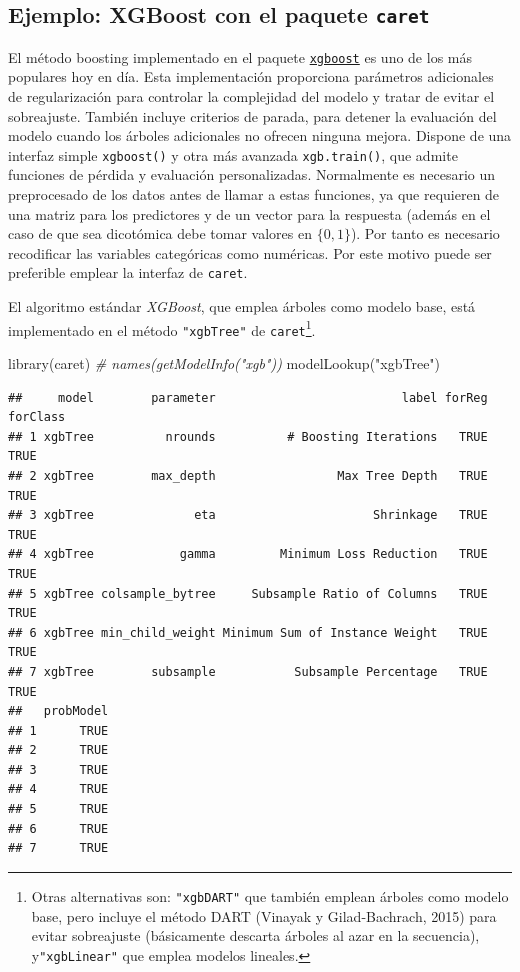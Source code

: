 \documentclass[
]{book}
\newenvironment{Shaded}{\begin{snugshade}}{\end{snugshade}}
\newcommand{\CommentTok}[1]{\textcolor[rgb]{0.56,0.35,0.01}{\textit{#1}}}
\newcommand{\FunctionTok}[1]{\textcolor[rgb]{0.00,0.00,0.00}{#1}}
\newcommand{\NormalTok}[1]{#1}
\newcommand{\StringTok}[1]{\textcolor[rgb]{0.31,0.60,0.02}{#1}}
\theoremstyle{break}
\theoremstyle{definition}
\theoremstyle{definition}
\theoremstyle{definition}
\theoremstyle{definition}
\theoremstyle{remark}
\begin{document}
\hypertarget{ejemplo-xgboost-con-el-paquete-caret}{%
\subsection{\texorpdfstring{Ejemplo: XGBoost con el paquete \texttt{caret}}{Ejemplo: XGBoost con el paquete caret}}\label{ejemplo-xgboost-con-el-paquete-caret}}

El método boosting implementado en el paquete \href{https://github.com/dmlc/xgboost/tree/master/R-package}{\texttt{xgboost}} es uno de los más populares hoy en día.
Esta implementación proporciona parámetros adicionales de regularización para controlar la complejidad del modelo y tratar de evitar el sobreajuste.
También incluye criterios de parada, para detener la evaluación del modelo cuando los árboles adicionales no ofrecen ninguna mejora.
Dispone de una interfaz simple \texttt{xgboost()} y otra más avanzada \texttt{xgb.train()}, que admite funciones de pérdida y evaluación personalizadas.
Normalmente es necesario un preprocesado de los datos antes de llamar a estas funciones, ya que requieren de una matriz para los predictores y de un vector para la respuesta (además en el caso de que sea dicotómica debe tomar valores en \(\{0, 1\}\)). Por tanto es necesario recodificar las variables categóricas como numéricas.
Por este motivo puede ser preferible emplear la interfaz de \texttt{caret}.

El algoritmo estándar \emph{XGBoost}, que emplea árboles como modelo base, está implementado en el método \texttt{"xgbTree"} de \texttt{caret}\footnote{Otras alternativas son: \texttt{"xgbDART"} que también emplean árboles como modelo base, pero incluye el método DART (Vinayak y Gilad-Bachrach, 2015) para evitar sobreajuste (básicamente descarta árboles al azar en la secuencia), y\texttt{"xgbLinear"} que emplea modelos lineales.}.

\begin{Shaded}
\begin{Highlighting}[]
\FunctionTok{library}\NormalTok{(caret)}
\CommentTok{\# names(getModelInfo("xgb"))}
\FunctionTok{modelLookup}\NormalTok{(}\StringTok{"xgbTree"}\NormalTok{)}
\end{Highlighting}
\end{Shaded}

\begin{verbatim}
##     model        parameter                          label forReg forClass
## 1 xgbTree          nrounds          # Boosting Iterations   TRUE     TRUE
## 2 xgbTree        max_depth                 Max Tree Depth   TRUE     TRUE
## 3 xgbTree              eta                      Shrinkage   TRUE     TRUE
## 4 xgbTree            gamma         Minimum Loss Reduction   TRUE     TRUE
## 5 xgbTree colsample_bytree     Subsample Ratio of Columns   TRUE     TRUE
## 6 xgbTree min_child_weight Minimum Sum of Instance Weight   TRUE     TRUE
## 7 xgbTree        subsample           Subsample Percentage   TRUE     TRUE
##   probModel
## 1      TRUE
## 2      TRUE
## 3      TRUE
## 4      TRUE
## 5      TRUE
## 6      TRUE
## 7      TRUE
\end{verbatim}
\end{document}
